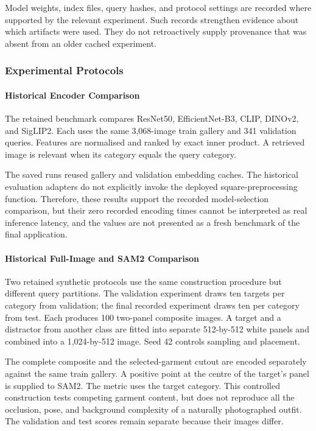 Model weights, index files, query hashes, and protocol settings are recorded
where supported by the relevant experiment. Such records strengthen evidence
about which artifacts were used. They do not retroactively supply provenance
that was absent from an older cached experiment.

\subsubsection{Experimental Protocols}
\paragraph{Historical Encoder Comparison}
The retained benchmark compares ResNet50, EfficientNet-B3, CLIP, DINOv2, and
SigLIP2. Each uses the same 3,068-image train gallery and 341 validation queries.
Features are normalised and ranked by exact inner product. A retrieved image is
relevant when its category equals the query category.

The saved runs reused gallery and validation embedding caches. The historical
evaluation adapters do not explicitly invoke the deployed square-preprocessing
function. Therefore, these results support the recorded model-selection
comparison, but their zero recorded encoding times cannot be interpreted as
real inference latency, and the values are not presented as a fresh benchmark
of the final application.

\paragraph{Historical Full-Image and SAM2 Comparison}
Two retained synthetic protocols use the same construction procedure but
different query partitions. The validation experiment draws ten targets per
category from validation; the final recorded experiment draws ten per category
from test. Each produces 100 two-panel composite images. A target and a
distractor from another class are fitted into separate 512-by-512 white panels
and combined into a 1,024-by-512 image. Seed 42 controls sampling and placement.

The complete composite and the selected-garment cutout are encoded separately
against the same train gallery. A positive point at the centre of the target's
panel is supplied to SAM2. The metric uses the target category. This controlled
construction tests competing garment content, but does not reproduce all the
occlusion, pose, and background complexity of a naturally photographed outfit.
The validation and test scores remain separate because their images differ.

